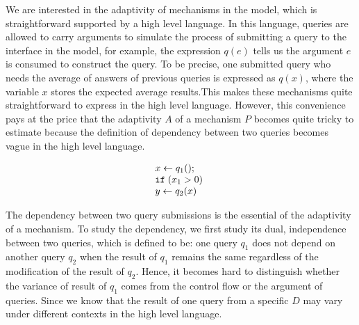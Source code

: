 \documentclass[a4paper,11pt]{article}
\begin{document}
We are interested in the adaptivity of mechanisms in the model, which is straightforward supported by a high level language. In this language, queries are allowed to carry arguments to simulate the process of submitting a query to the interface in
the model, for example, the expression $q(e)$ tells us the argument $e$ is consumed to construct the
query. To be precise, one submitted query who needs the average of
answers of previous queries is expressed as $q(x)$, where the variable $x$ stores
the expected average results.This makes these mechanisms quite straightforward to express in the high level language. However, this convenience pays at the price that the adaptivity $A$ of a mechanism $P$ becomes quite tricky to estimate because the definition of dependency between two queries becomes vague in the high level language. 

\[
\begin{array}{l}
     x \leftarrow q_1() ; \\
    \mathtt{if} \; (x_1 > 0 )\; \\
     y \leftarrow q_2(x) \; \\
\end{array}
\]

The dependency between two query submissions is the essential of the adaptivity of a mechanism. To study the dependency, we first study its dual, independence between two queries, which is defined to be: one query
$q_1$ does not
depend on another query $q_2$ when the result of $q_1$ remains the
same regardless of the modification of the result of $q_2$. Hence, it becomes hard to distinguish whether the variance of result of $q_1$ comes from the control flow or the argument of queries. Since we know that the result of one query from a specific $D$ may vary under different contexts in the high level language.  




\end{document}
